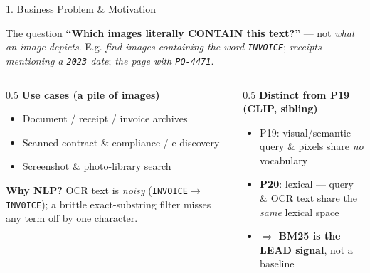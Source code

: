 \documentclass[10pt,aspectratio=169]{beamer}
\begin{document}
\begin{frame}{1. Business Problem \& Motivation}
\begin{block}{The question}
\textbf{``Which images literally CONTAIN this text?''} --- not \emph{what an image depicts}. E.g. \textit{find images containing the word \texttt{INVOICE}}; \textit{receipts mentioning a \texttt{2023} date}; \textit{the page with \texttt{PO-4471}}.
\end{block}

\begin{columns}[T]
\begin{column}{0.5\textwidth}
\textbf{Use cases (a pile of images)}
\begin{itemize}
  \item Document / receipt / invoice archives
  \item Scanned-contract \& compliance / e-discovery
  \item Screenshot \& photo-library search
\end{itemize}
\textbf{Why NLP?} OCR text is \emph{noisy} (\texttt{INVOICE}$\to$\texttt{INV0ICE}); a brittle exact-substring filter misses any term off by one character.
\end{column}
\begin{column}{0.5\textwidth}
\textbf{Distinct from P19 (CLIP, sibling)}
\begin{itemize}
  \item P19: visual/semantic --- query \& pixels share \emph{no} vocabulary
  \item \textbf{P20}: lexical --- query \& OCR text share the \emph{same} lexical space
  \item $\Rightarrow$ \textbf{BM25 is the LEAD signal}, not a baseline
\end{itemize}
\end{column}
\end{columns}
\end{frame}
\end{document}
